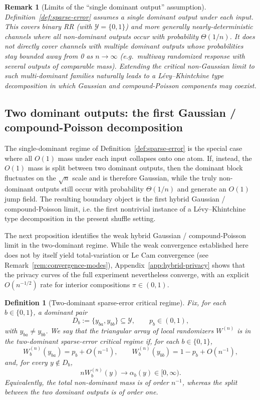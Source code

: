 \documentclass{article}
\newtheorem{definition}[theorem]{Definition}
\newtheorem{remark}[theorem]{Remark}
\begin{document}
\begin{remark}[Limits of the ``single dominant output'' assumption]
Definition~\ref{def:sparse-error} assumes a single dominant output under each input. This covers binary RR (with $\mathcal{Y} = \{0,1\}$) and more generally
nearly-deterministic channels where all non-dominant outputs occur with probability $\Theta(1/n)$. It
does not directly cover channels with multiple dominant outputs whose probabilities stay bounded
away from 0 as $n \to \infty$ (e.g.\ multiway randomized response with several outputs of comparable
mass). Extending the critical non-Gaussian limit to such multi-dominant families naturally leads to
a L\'{e}vy--Khintchine type decomposition in which Gaussian and compound-Poisson components may
coexist.
\end{remark}

\subsection{Two dominant outputs: the first Gaussian / compound-Poisson decomposition}

The single-dominant regime of Definition~\ref{def:sparse-error} is the special case where all $O(1)$ mass under each
input collapses onto one atom. If, instead, the $O(1)$ mass is split between two dominant outputs,
then the dominant block fluctuates on the $\sqrt n$ scale and is therefore Gaussian, while the truly
non-dominant outputs still occur with probability $\Theta(1/n)$ and generate an $O(1)$ jump field.
The resulting boundary object is the first hybrid Gaussian / compound-Poisson limit, i.e. the first
nontrivial instance of a L\'evy--Khintchine type decomposition in the present shuffle setting.

The next proposition identifies the weak hybrid Gaussian / compound-Poisson limit in the 
two-dominant regime. While the weak convergence established here does not by itself yield 
total-variation or Le Cam convergence (see Remark~\ref{rem:convergence-modes}), 
Appendix~\ref{app:hybrid-privacy} shows that the privacy curves of the full experiment 
nevertheless converge, with an explicit $O(n^{-1/2})$ rate for interior compositions 
$\pi\in(0,1)$.

\begin{definition}[Two-dominant sparse-error critical regime]
\label{def:two-dominant-sparse-error}
Fix, for each $b\in\{0,1\}$, a dominant pair
\[
D_b:=\{y_{ba},y_{bb}\}\subseteq \mathcal Y,
\qquad
p_b\in(0,1),
\]
with $y_{ba}\neq y_{bb}$. We say that the triangular array of local randomizers $W^{(n)}$ is in the
\emph{two-dominant sparse-error critical regime} if, for each $b\in\{0,1\}$,
\[
W_b^{(n)}(y_{ba})=p_b+O(n^{-1}),
\qquad
W_b^{(n)}(y_{bb})=1-p_b+O(n^{-1}),
\]
and, for every $y\notin D_b$,
\[
nW_b^{(n)}(y)\to \alpha_b(y)\in[0,\infty).
\]
Equivalently, the total non-dominant mass is of order $n^{-1}$, whereas the split between the two dominant
outputs is of order one.
\end{definition}
\end{document}
